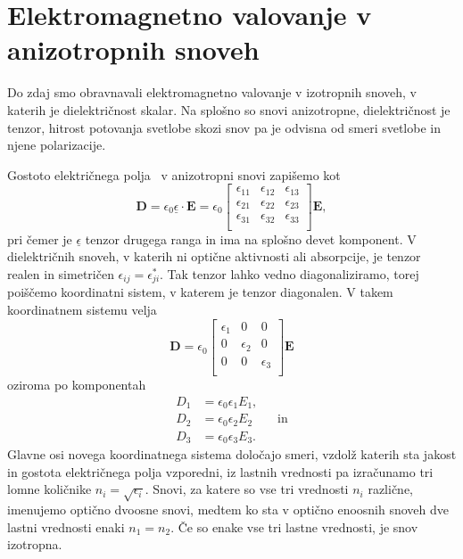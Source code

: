\section{Elektromagnetno valovanje v anizotropnih snoveh}\label{chap:anizotropni}
Do zdaj smo obravnavali elektromagnetno valovanje
v izotropnih snoveh, v katerih je di\-elek\-tri\-čnost skalar. 
Na splošno so snovi anizotropne,
dielektričnost je tenzor, hitrost potovanja svetlobe 
skozi snov pa je odvisna od smeri svetlobe in njene polarizacije.

Gostoto električnega polja~ v anizotropni snovi zapišemo kot 
\begin{equation}
\mathbf{D}=\epsilon_{0}\underline{\epsilon} \cdot\mathbf{E} = 
\epsilon_{0}
\left[\begin{array}{ccc}
\epsilon_{11} & \epsilon_{12}& \epsilon_{13}\\
\epsilon_{21} & \epsilon_{22}& \epsilon_{23}\\
\epsilon_{31} & \epsilon_{32}& \epsilon_{33}\\
\end{array}\right]\!\mathbf{E},
\label{eq:gostota-elektricnega-polja-tenzor}
\end{equation}
pri čemer je $\underline{\epsilon}$ tenzor drugega ranga in ima na splošno devet komponent.
V dielektričnih snoveh, v katerih ni optične aktivnosti ali absorpcije, je tenzor
realen in simetričen $\epsilon_{ij}=\epsilon_{ji}^*$. Tak tenzor lahko vedno
diagonaliziramo, torej poiščemo koordinatni sistem, v katerem je tenzor
diagonalen. V takem koordinatnem sistemu velja 
\begin{equation}
\mathbf{D} = \epsilon_{0}
\left[\begin{array}{ccc}
\epsilon_{1} & 0& 0\\
0 & \epsilon_{2}& 0\\
0 & 0& \epsilon_{3}\\
\end{array}\right]\!\mathbf{E}
\label{eq:gostota-elektricnega-polja-lastni}
\end{equation}
oziroma po komponentah
\begin{align}
D_{1}&=\epsilon_{0}\epsilon_{1}E_{1}, \nonumber \\
D_{2}&=\epsilon_{0}\epsilon_{2}E_{2} \nonumber \qquad \mathrm{in} \\
 D_{3}&=\epsilon_{0}\epsilon_{3}E_{3}.
 \end{align}
Glavne osi novega koordinatnega sistema določajo smeri, vzdolž katerih sta jakost
in gostota električnega polja vzporedni, iz lastnih vrednosti 
pa izračunamo tri lomne količnike $n_{i}=\sqrt{\epsilon_{i}}$. Snovi,
za katere so vse tri vrednosti $n_i$ različne, imenujemo optično dvoosne snovi, 
medtem ko sta v optično enoosnih snoveh dve lastni vrednosti enaki $n_{1}=n_{2}$. 
Če so enake vse tri lastne vrednosti, je snov izotropna.

